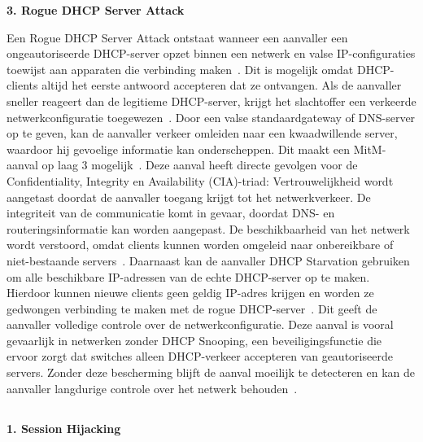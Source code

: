 \vspace{0.5cm}
\textbf{3. Rogue DHCP Server Attack}

Een Rogue DHCP Server Attack ontstaat wanneer een aanvaller een ongeautoriseerde DHCP-server opzet binnen een netwerk en valse IP-configuraties toewijst aan apparaten die verbinding maken~\autocite{dilworth2025}. Dit is mogelijk omdat DHCP-clients altijd het eerste antwoord accepteren dat ze ontvangen. Als de aanvaller sneller reageert dan de legitieme DHCP-server, krijgt het slachtoffer een verkeerde netwerkconfiguratie toegewezen~\autocite{dilworth2025}.
Door een valse standaardgateway of DNS-server op te geven, kan de aanvaller verkeer omleiden naar een kwaadwillende server, waardoor hij gevoelige informatie kan onderscheppen. Dit maakt een MitM-aanval op laag 3 mogelijk~\autocite{dilworth2025}.
Deze aanval heeft directe gevolgen voor de Confidentiality, Integrity en Availability (CIA)-triad:
Vertrouwelijkheid wordt aangetast doordat de aanvaller toegang krijgt tot het netwerkverkeer.
De integriteit van de communicatie komt in gevaar, doordat DNS- en routeringsinformatie kan worden aangepast.
De beschikbaarheid van het netwerk wordt verstoord, omdat clients kunnen worden omgeleid naar onbereikbare of niet-bestaande servers~\autocite{dilworth2025}.
Daarnaast kan de aanvaller DHCP Starvation gebruiken om alle beschikbare IP-adressen van de echte DHCP-server op te maken. Hierdoor kunnen nieuwe clients geen geldig IP-adres krijgen en worden ze gedwongen verbinding te maken met de rogue DHCP-server~\autocite{dilworth2025}. Dit geeft de aanvaller volledige controle over de netwerkconfiguratie.
Deze aanval is vooral gevaarlijk in netwerken zonder DHCP Snooping, een beveiligingsfunctie die ervoor zorgt dat switches alleen DHCP-verkeer accepteren van geautoriseerde servers. Zonder deze bescherming blijft de aanval moeilijk te detecteren en kan de aanvaller langdurige controle over het netwerk behouden~\autocite{dilworth2025}.


\subsection{}
\label{sec:MitM-aanvallen op de Transport}

\vspace{0.5cm}
\textbf{1. Session Hijacking}

